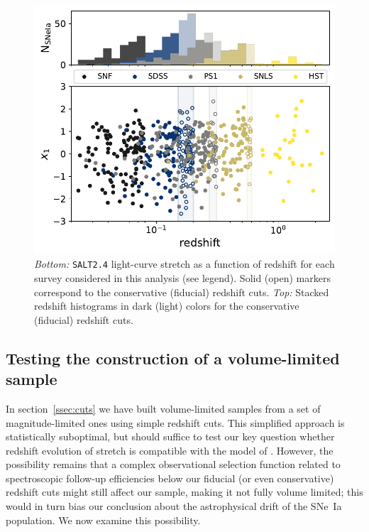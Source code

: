 \documentclass[]{aa}
\begin{document}
\begin{figure}
    \centering
    \includegraphics[width=0.95\linewidth]{Article_figures/stretchs-cut_btw_hist_stac_75-lb-cividis.pdf}
    \caption{\textit{Bottom:} \textsc{\texttt{SALT2.4}} light-curve stretch as a
        function of redshift for each survey considered in this analysis (see
        legend). Solid (open) markers correspond to the conservative
        (fiducial) redshift cuts. \textit{Top:} Stacked redshift
    histograms in dark (light) colors for the conservative (fiducial) redshift cuts.}
    \label{fig:sample}
\end{figure}

\subsection{Testing the construction of a volume-limited sample}\label{ssec:verify}

In section~\ref{ssec:cuts} we have built volume-limited samples from a set of
magnitude-limited ones using simple redshift cuts. This simplified approach is
statistically suboptimal, but should suffice to test our key question
whether redshift evolution of stretch is compatible with the model of \cite{rigault2020}. However, the possibility remains that a complex observational selection
function related to spectroscopic follow-up efficiencies below our fiducial (or
even conservative) redshift cuts might still affect our sample, making it not
fully volume limited; this would in turn bias our conclusion about the
astrophysical drift of the SNe~Ia population. We now examine this possibility.
\end{document}
